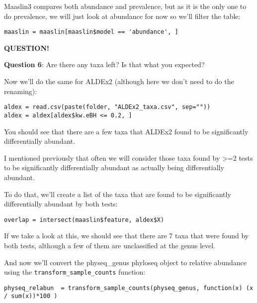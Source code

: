 \documentclass[
]{book}
\newenvironment{bluebox}{
  \definecolor{shadecolor}{RGB}{172, 210, 237}
  \color{white}
  \begin{shaded}}
 {\end{shaded}}
\begin{document}
Maaslin3 compares both abundance and prevalence, but as it is the only one to do prevalence, we will just look at abundance for now so we'll filter the table:

\begin{verbatim}
maaslin = maaslin[maaslin$model == 'abundance', ]
\end{verbatim}

\begin{bluebox}

\begin{center}
\textbf{QUESTION!}

\end{center}

\textbf{Question 6}: Are there any taxa left? Is that what you expected?

\end{bluebox}

Now we'll do the same for ALDEx2 (although here we don't need to do the renaming):

\begin{verbatim}
aldex = read.csv(paste(folder, "ALDEx2_taxa.csv", sep=""))
aldex = aldex[aldex$kw.eBH <= 0.2, ]
\end{verbatim}

You should see that there are a few taxa that ALDEx2 found to be significantly differentially abundant.

I mentioned previously that often we will consider those taxa found by \textgreater=2 tests to be significantly differentially abundant as actually being differentially abundant.

To do that, we'll create a list of the taxa that are found to be significantly differentially abundant by both tests:

\begin{verbatim}
overlap = intersect(maaslin$feature, aldex$X)
\end{verbatim}

If we take a look at this, we should see that there are 7 taxa that were found by both tests, although a few of them are unclassified at the genus level.

And now we'll convert the physeq\_genus phyloseq object to relative abundance using the \texttt{transform\_sample\_counts} function:

\begin{verbatim}
physeq_relabun  = transform_sample_counts(physeq_genus, function(x) (x / sum(x))*100 )
\end{verbatim}
\end{document}
